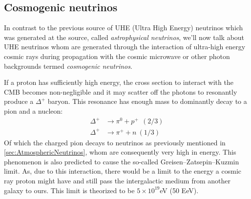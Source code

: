 \subsection{Cosmogenic neutrinos}
In contrast to the previous source of UHE (Ultra High Energy) neutrinos which
was generated at the source, called \textit{astrophysical neutrinos}, we'll now
talk about UHE neutrinos whom are generated through the interaction of
ultra-high energy cosmic rays during propagation with the cosmic microwave or
other photon backgrounds termed \textit{cosmogenic neutrinos}.  

If a proton has sufficiently high energy, the cross
section to interact with the CMB becomes
non-negligible and it may scatter off the photons to
resonantly produce a $\Delta^+$ baryon.  This resonance has enough mass to
dominantly decay to a pion and a nucleon\cite{M_ller_2019}:
\begin{align}
	\Delta^+ &\rightarrow \pi^0 + p^+ \ \ (2/3)\\
	\Delta^+ &\rightarrow \pi^+ + n \ (1/3)
\end{align}
Of which the charged pion decays to neutrinos as previously mentioned in 
\ref{sec:AtmosphericNeutrinos}, whom are consequently very high in energy.
This phenomenon is also predicted to cause the so-called Greisen–Zatsepin–Kuzmin\cite{Zatsepin}\cite{Greisen} 
limit. As, due to this interaction, there would be a limit to the energy a cosmic ray proton might have
and still pass the intergalactic medium from another galaxy to ours. This limit is theorized to be
$5\times10^{19}$eV (50 EeV). 
